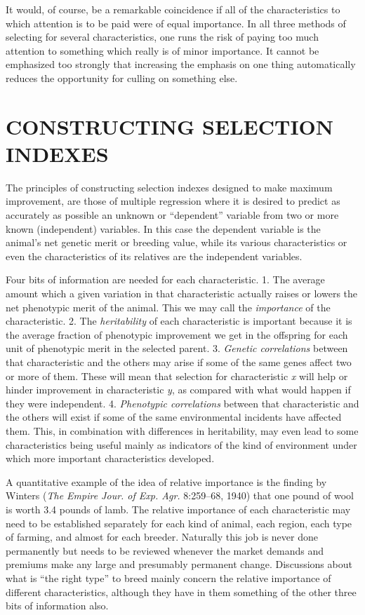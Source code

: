 It would, of course, be a remarkable coincidence if all of the characteristics
to which attention is to be paid were of equal importance. In
all three methods of selecting for several characteristics, one runs the
risk of paying too much attention to something which really is of minor
importance. It cannot be emphasized too strongly that increasing the
emphasis on one thing automatically reduces the opportunity for culling
on something else.

\section*{CONSTRUCTING SELECTION INDEXES}

The principles of constructing selection indexes designed to make
maximum improvement, are those of multiple regression where it is
desired to predict as accurately as possible an unknown or ``dependent''
variable from two or more known (independent) variables. In this case
the dependent variable is the animal's net genetic merit or breeding
value, while its various characteristics or even the characteristics of its
relatives are the independent variables.

Four bits of information are needed for each characteristic. 1. The
average amount which a given variation in that characteristic actually
raises or lowers the net phenotypic merit of the animal. This we may
call the \textit{importance} of the characteristic. 2. The \textit{heritability} of each
characteristic is important because it is the average fraction of phenotypic
improvement we get in the offspring for each unit of phenotypic
merit in the selected parent. 3. \textit{Genetic correlations} between that 
characteristic and the others may arise if some of the same genes affect two
or more of them. These will mean that selection for characteristic \textit{x} will
help or hinder improvement in characteristic \textit{y}, as compared with what
would happen if they were independent. 4. \textit{Phenotypic correlations}
between that characteristic and the others will exist if some of the same
environmental incidents have affected them. This, in combination with
differences in heritability, may even lead to some characteristics being
useful mainly as indicators of the kind of environment under which
more important characteristics developed.

A quantitative example of the idea of relative importance is the
finding by Winters (\textit{The Empire Jour. of Exp. Agr.} 8:259--68, 1940)
that one pound of wool is worth 3.4 pounds of lamb. The relative
importance of each characteristic may need to be established separately
for each kind of animal, each region, each type of farming, and almost
for each breeder. Naturally this job is never done permanently but
needs to be reviewed whenever the market demands and premiums
make any large and presumably permanent change. Discussions about
what is ``the right type'' to breed mainly concern the relative importance
of different characteristics, although they have in them something
of the other three bits of information also.

